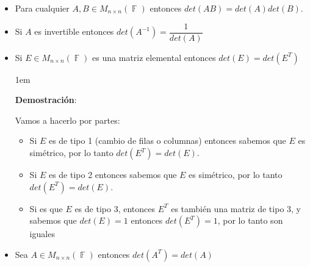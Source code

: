 \documentclass[12pt, fleqn]{report}                             %
\newenvironment{SmallIndentation}[1][0.75em]                    %
        {\begin{adjustwidth}{#1}{}\begin{footnotesize}}             %
        {\end{footnotesize}\end{adjustwidth}}                       %
\theoremstyle{break}                                            %
\DeclareMathOperator \GenericField {\mathbb{F}}                 %
\begin{document}
                \begin{itemize}

                    \item
                        Para cualquier $A, B \in M_{n \times n}(\GenericField)$
                        entonces $det(AB) = det(A) det(B)$.

                    \item
                        Si $A$ es invertible entonces $det(A^{-1}) = \dfrac{1}{det(A)}$

                    \item
                        Si $E \in M_{n \times n}(\GenericField)$ es una matriz elemental
                        entonces $det(E) = det(E^T)$

                        \begin{SmallIndentation}[1em]
                            \textbf{Demostración}:
                            
                            Vamos a hacerlo por partes:
                            \begin{itemize}
                                
                                \item 
                                    Si $E$ es de tipo 1 (cambio de filas o columnas) entonces
                                    sabemos que $E$ es simétrico, por lo tanto $det(E^T) = det(E)$.

                                \item 
                                    Si $E$ es de tipo 2 entonces sabemos que $E$ es simétrico,
                                    por lo tanto $det(E^T) = det(E)$.

                                \item
                                    Si es que $E$ es de tipo 3, entonces $E^T$ es también una matriz 
                                    de tipo 3, y sabemos que $det(E) = 1$ entonces $det(E^T) = 1$, por lo
                                    tanto son iguales 
                            \end{itemize}
                        
                        \end{SmallIndentation}
                            

                    \item
                        Sea $A \in M_{n \times n}(\GenericField)$
                        entonces $det(A^T) = det(A)$


\end{itemize}
\end{document}
